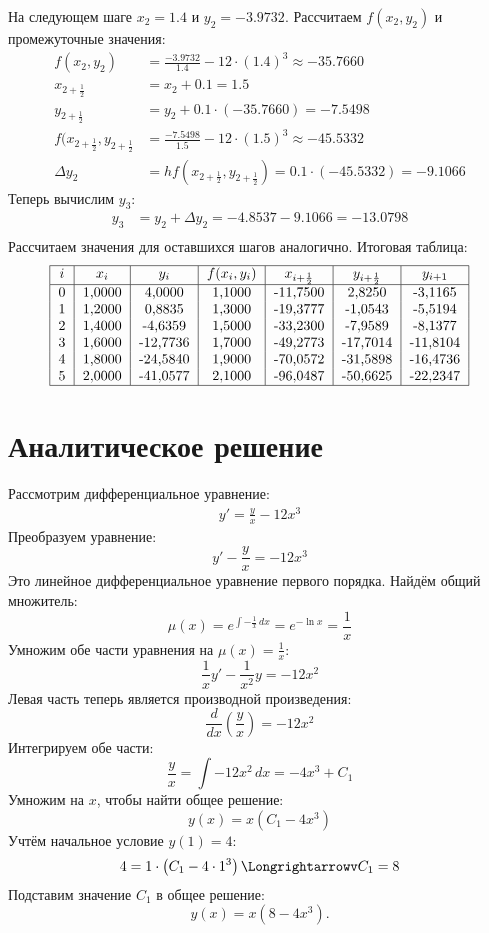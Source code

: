 \documentclass[a4paper,12pt]{article}
\begin{document}
На следующем шаге $x_2 = 1.4$ и $y_2 = -3.9732$. Рассчитаем $f(x_2, y_2)$ и промежуточные значения:
\begin{align*}
    f(x_2, y_2) &= \frac{-3.9732}{1.4} - 12 \cdot (1.4)^3 \approx -35.7660\\
    x_{2+\frac{1}{2}} &= x_2 + 0.1 = 1.5\\
    y_{2+\frac{1}{2}} &= y_2 + 0.1 \cdot (-35.7660) = -7.5498\\
    f(x_{2+\frac{1}{2}}, y_{2+\frac{1}{2}} &= \frac{-7.5498}{1.5} - 12 \cdot (1.5)^3 \approx -45.5332 \\
    \Delta{y_2} &= hf(x_{2+\frac{1}{2}}, y_{2+\frac{1}{2}}) = 0.1 \cdot (-45.5332) = -9.1066
\end{align*}
Теперь вычислим $y_3$:
\begin{align*}
    y_3 &= y_2 + \Delta{y_2} = -4.8537 - 9.1066 = -13.0798\\
\end{align*}
Рассчитаем значения для оставшихся шагов аналогично. Итоговая таблица:
\begin{align*}
    \begin{tabular}{|c|c|c|c|c|c|c|}
        \hline
        $i$ & $x_i$ & $y_i$ & $f(x_i, y_i)$ & $x_{i+\frac{1}{2}}$ & $y_{i+\frac{1}{2}}$ & $y_{i+1}$ \\
        \hline
        0 & 1,0000 & 4,0000   & 1,1000 & -11,7500 & 2,8250   & -3,1165  \\
        1 & 1,2000 & 0,8835   & 1,3000 & -19,3777 & -1,0543  & -5,5194  \\
        2 & 1,4000 & -4,6359  & 1,5000 & -33,2300 & -7,9589  & -8,1377  \\
        3 & 1,6000 & -12,7736 & 1,7000 & -49,2773 & -17,7014 & -11,8104 \\
        4 & 1,8000 & -24,5840 & 1,9000 & -70,0572 & -31,5898 & -16,4736 \\
        5 & 2,0000 & -41,0577 & 2,1000 & -96,0487 & -50,6625 & -22,2347 \\
        \hline
    \end{tabular}
\end{align*}

\section*{Аналитическое решение}
Рассмотрим дифференциальное уравнение:
\begin{align*}
    y' = \frac{y}{x} - 12x^3
\end{align*}
Преобразуем уравнение:
\[
y' - \frac{y}{x} = -12x^3
\]
Это линейное дифференциальное уравнение первого порядка. Найдём общий множитель:
\[
\mu(x) = e^{\int -\frac{1}{x} \, dx} = e^{-\ln x} = \frac{1}{x}
\]
Умножим обе части уравнения на \(\mu(x) = \frac{1}{x}\):
\[
\frac{1}{x} y' - \frac{1}{x^2} y = -12x^2
\]
Левая часть теперь является производной произведения:
\[
\frac{d}{dx} \left(\frac{y}{x}\right) = -12x^2
\]
Интегрируем обе части:
\[
\frac{y}{x} = \int -12x^2 \, dx = -4x^3 + C_1
\]
Умножим на \(x\), чтобы найти общее решение:
\[
y(x) = x \left(C_1 - 4x^3\right)
\]
Учтём начальное условие \(y(1) = 4\):
\[
4 = 1 \cdot \left(C_1 - 4 \cdot 1^3\right) \Longrightarrowv C_1 = 8
\]
Подставим значение \(C_1\) в общее решение:
\[
y(x) = x \left(8 - 4x^3\right).
\]
\end{document}
